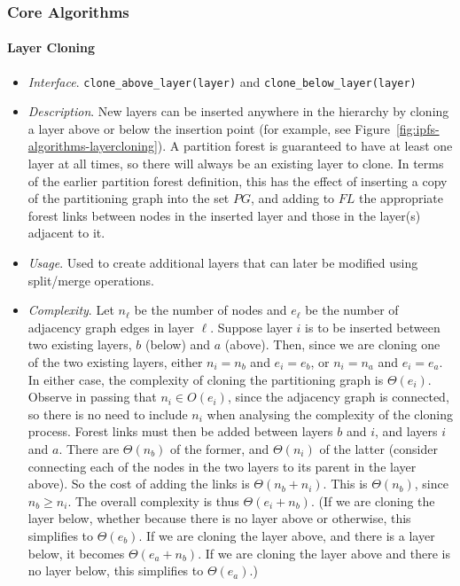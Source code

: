 \subsubsection{Core Algorithms}

\paragraph{Layer Cloning}

\begin{itemize}

\item \emph{Interface}. \texttt{clone_above_layer(layer)} and \texttt{clone_below_layer(layer)}

\item \emph{Description}. New layers can be inserted anywhere in the hierarchy by cloning a layer above or below the insertion point (for example, see Figure~\ref{fig:ipfs-algorithms-layercloning}). A partition forest is guaranteed to have at least one layer at all times, so there will always be an existing layer to clone. In terms of the earlier partition forest definition, this has the effect of inserting a copy of the partitioning graph into the set $\textit{PG}$, and adding to $\textit{FL}$ the appropriate forest links between nodes in the inserted layer and those in the layer(s) adjacent to it.

\item \emph{Usage}. Used to create additional layers that can later be modified using split/merge operations.

\item \emph{Complexity}. Let $n_\ell$ be the number of nodes and $e_\ell$ be the number of adjacency graph edges in layer $\ell$. Suppose layer $i$ is to be inserted between two existing layers, $b$ (below) and $a$ (above). Then, since we are cloning one of the two existing layers, either $n_i = n_b$ and $e_i = e_b$, or $n_i = n_a$ and $e_i = e_a$. In either case, the complexity of cloning the partitioning graph is $\Theta(e_i)$. Observe in passing that $n_i \in O(e_i)$, since the adjacency graph is connected, so there is no need to include $n_i$ when analysing the complexity of the cloning process. Forest links must then be added between layers $b$ and $i$, and layers $i$ and $a$. There are $\Theta(n_b)$ of the former, and $\Theta(n_i)$ of the latter (consider connecting each of the nodes in the two layers to its parent in the layer above). So the cost of adding the links is $\Theta(n_b + n_i)$. This is $\Theta(n_b)$, since $n_b \ge n_i$. The overall complexity is thus $\Theta(e_i + n_b)$. (If we are cloning the layer below, whether because there is no layer above or otherwise, this simplifies to $\Theta(e_b)$. If we are cloning the layer above, and there is a layer below, it becomes $\Theta(e_a + n_b)$. If we are cloning the layer above and there is no layer below, this simplifies to $\Theta(e_a)$.)

\end{itemize}

